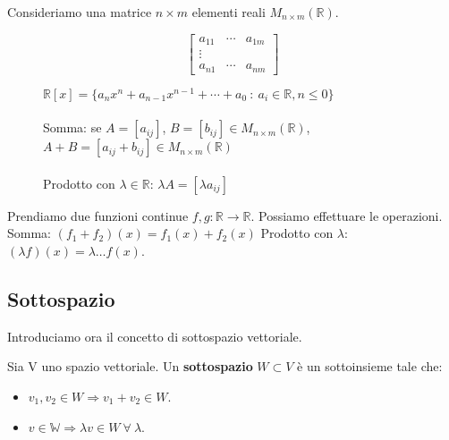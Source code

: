 \begin{example}
Consideriamo una matrice $n \times m$ elementi reali $M_{n\times m}(\mathbb{R})$.
\begin{figure}[h!]
    \begin{minipage}{.2\linewidth}
    \vspace{-10pt}
    \centering
    \[
    \begin{bmatrix}
    a_{11} & \cdots & a_{1m}\\
    \vdots \\
    a_{n1} & \cdots & a_{nm}
    \end{bmatrix}
    \]
    \end{minipage}
    \begin{minipage}{.75\linewidth}
    $\mathbb{R}[x] = \{a_nx^n + a_{n-1}x^{n-1} + \cdots + a_0 \: : \: a_i \in \mathbb{R}, n \leq 0\}$\\\\
    Somma: se $A = [a_{ij}]$, $B = [b_{ij}] \in M_{n\times m}(\mathbb{R})$, $A + B = [a_{ij} + b_{ij}] \in M_{n\times m}(\mathbb{R})$\\\\
    Prodotto con $\lambda \in \mathbb{R}$: $\lambda A = [\lambda a_{ij}]$
    \end{minipage}
\end{figure}
\end{example}

\begin{example}
Prendiamo due funzioni continue $f, g: \mathbb{R}\to \mathbb{R}$. Possiamo effettuare le operazioni.
Somma: $(f_1 + f_2)(x) = f_1(x) + f_2(x)$ \hspace{.3cm} Prodotto con $\lambda$: $(\lambda f)(x) = \lambda \ldots f(x)$.
\end{example}

\subsection{Sottospazio}
Introduciamo ora il concetto di sottospazio vettoriale.
\begin{definition}[Sottospazio]
Sia V uno spazio vettoriale. Un \textbf{sottospazio} $W \subset V$ è un sottoinsieme tale che:
\begin{itemize}
    \item $v_1, v_2 \in W \Longrightarrow v_1 + v_2 \in W$.
    \item $v \in \mathbb{W} \Longrightarrow \lambda v \in W \:\forall \: \lambda$.
\end{itemize}
\end{definition}

